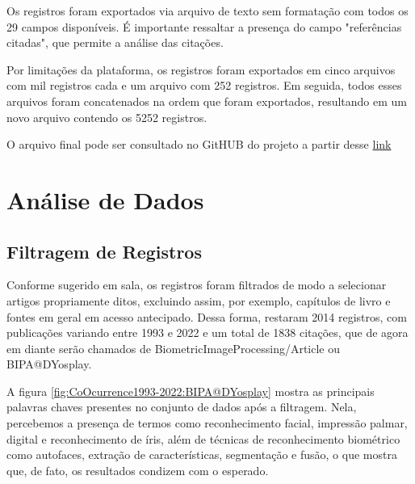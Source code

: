 Os registros foram exportados via arquivo de texto sem formatação com todos os 29 campos disponíveis. É importante ressaltar a presença do campo "referências citadas", que permite a análise das citações.

Por limitações da plataforma, os registros foram exportados em cinco arquivos com mil registros cada e um arquivo com 252 registros. Em seguida, todos esses arquivos foram concatenados na ordem que foram exportados, resultando em um novo arquivo contendo os 5252 registros.

O arquivo final pode ser consultado no GitHUB do projeto a partir desse \href{https://github.com/jhcf/Comput-Experim-20212/tree/main/experiments/DYosplay/PesquisaBibliometrica/Pesquisas}{link} 

\section{Análise de Dados}

\subsection{Filtragem de Registros}

Conforme sugerido em sala, os registros foram filtrados de modo a selecionar artigos propriamente ditos, excluindo assim, por exemplo, capítulos de livro e fontes em geral em acesso antecipado. Dessa forma, restaram 2014 registros, com publicações variando entre 1993 e 2022 e um total de 1838 citações, que de agora em diante serão chamados de BiometricImageProcessing/Article ou BIPA@DYosplay.

A figura \ref{fig:CoOcurrence1993-2022:BIPA@DYosplay} mostra as principais palavras chaves presentes no conjunto de dados após a filtragem. Nela, percebemos a presença de termos como reconhecimento facial, impressão palmar, digital e reconhecimento de íris, além de técnicas de reconhecimento biométrico como autofaces, extração de características, segmentação e fusão, o que mostra que, de fato, os resultados condizem com o esperado.

